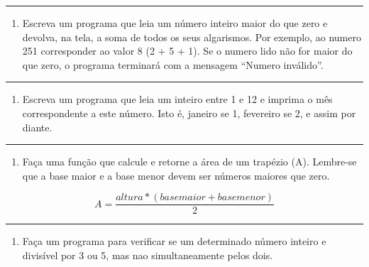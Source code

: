 \documentclass[12pt,a4paper]{article}
\providecommand{\tightlist}{%
      \setlength{\itemsep}{0pt}\setlength{\parskip}{0pt}}
\begin{document}
    \begin{center}\rule{0.5\linewidth}{0.5pt}\end{center}

\begin{enumerate}
\def\labelenumi{\arabic{enumi}.}
\setcounter{enumi}{1}
\tightlist
\item
  Escreva um programa que leia um número inteiro maior do que zero e
  devolva, na tela, a soma de todos os seus algarismos. Por exemplo, ao
  numero 251 corresponder ao valor 8 (2 + 5 + 1). Se o numero lido não
  for maior do que zero, o programa terminará com a mensagem ``Numero
  inválido''.
\end{enumerate}

    \begin{center}\rule{0.5\linewidth}{0.5pt}\end{center}

\begin{enumerate}
\def\labelenumi{\arabic{enumi}.}
\setcounter{enumi}{2}
\tightlist
\item
  Escreva um programa que leia um inteiro entre 1 e 12 e imprima o mês
  correspondente a este número. Isto é, janeiro se 1, fevereiro se 2, e
  assim por diante.
\end{enumerate}

    \begin{center}\rule{0.5\linewidth}{0.5pt}\end{center}

\begin{enumerate}
\def\labelenumi{\arabic{enumi}.}
\setcounter{enumi}{3}
\tightlist
\item
  Faça uma função que calcule e retorne a área de um trapézio (A).
  Lembre-se que a base maior e a base menor devem ser números maiores
  que zero.
\end{enumerate}

\[ A = \frac{altura*(basemaior + basemenor)}{2}\]

    \begin{center}\rule{0.5\linewidth}{0.5pt}\end{center}

\begin{enumerate}
\def\labelenumi{\arabic{enumi}.}
\setcounter{enumi}{4}
\tightlist
\item
  Faça um programa para verificar se um determinado número inteiro e
  divisível por 3 ou 5, mas nao simultaneamente pelos dois.
\end{enumerate}
\end{document}
